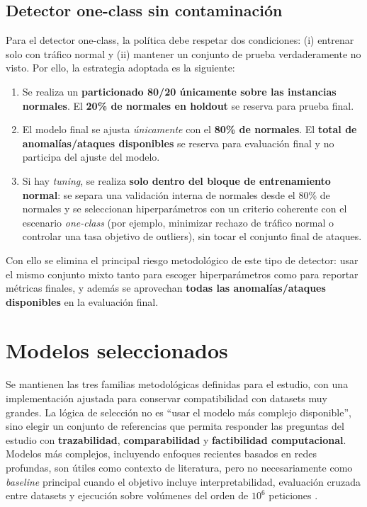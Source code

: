 \documentclass[12pt,oneside]{report}
\begin{document}
\subsection{Detector one-class sin contaminación}
Para el detector one-class, la política debe respetar dos condiciones: (i) entrenar solo con tráfico normal y (ii) mantener un conjunto de prueba verdaderamente no visto. Por ello, la estrategia adoptada es la siguiente:
\begin{enumerate}[leftmargin=*]
  \item Se realiza un \textbf{particionado 80/20 únicamente sobre las instancias normales}. El \textbf{20\% de normales en holdout} se reserva para prueba final.
  \item El modelo final se ajusta \emph{únicamente} con el \textbf{80\% de normales}. El \textbf{total de anomalías/ataques disponibles} se reserva para evaluación final y no participa del ajuste del modelo.
  \item Si hay \textit{tuning}, se realiza \textbf{solo dentro del bloque de entrenamiento normal}: se separa una validación interna de normales desde el 80\% de normales y se seleccionan hiperparámetros con un criterio coherente con el escenario \textit{one-class} (por ejemplo, minimizar rechazo de tráfico normal o controlar una tasa objetivo de outliers), sin tocar el conjunto final de ataques.
\end{enumerate}
Con ello se elimina el principal riesgo metodológico de este tipo de detector: usar el mismo conjunto mixto tanto para escoger hiperparámetros como para reportar métricas finales, y además se aprovechan \textbf{todas las anomalías/ataques disponibles} en la evaluación final.

\section{Modelos seleccionados}
Se mantienen las tres familias metodológicas definidas para el estudio, con una implementación ajustada para conservar compatibilidad con datasets muy grandes. La lógica de selección no es ``usar el modelo más complejo disponible'', sino elegir un conjunto de referencias que permita responder las preguntas del estudio con \textbf{trazabilidad}, \textbf{comparabilidad} y \textbf{factibilidad computacional}. Modelos más complejos, incluyendo enfoques recientes basados en redes profundas, son útiles como contexto de literatura, pero no necesariamente como \textit{baseline} principal cuando el objetivo incluye interpretabilidad, evaluación cruzada entre datasets y ejecución sobre volúmenes del orden de $10^6$ peticiones \cite{fang_2024,zhou_2024}.
\end{document}
